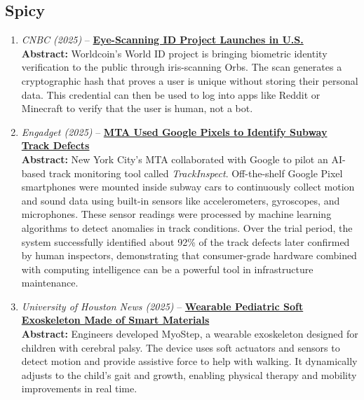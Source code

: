 \documentclass[12pt]{article}
\begin{document}
\begin{enumerate}[label=\arabic*.]
\end{enumerate}

\subsection*{Spicy}
\begin{enumerate}[label=\arabic*.]

 \item \textit{CNBC (2025)} -- \href{https://technews.acm.org/archives.cfm?fo=2025-04-apr#41}{\textbf{Eye-Scanning ID Project Launches in U.S.}}\\
\footnotesize\textbf{Abstract:} Worldcoin's World ID project is bringing biometric identity verification to the public through iris-scanning Orbs. The scan generates a cryptographic hash that proves a user is unique without storing their personal data. This credential can then be used to log into apps like Reddit or Minecraft to verify that the user is human, not a bot.\\

 \item \textit{Engadget (2025)} -- \href{https://technews.acm.org/archives.cfm?fo=2025-02-feb#35}{\textbf{MTA Used Google Pixels to Identify Subway Track Defects}}\\
\footnotesize\textbf{Abstract:} New York City’s MTA collaborated with Google to pilot an AI-based track monitoring tool called \textit{TrackInspect}. Off-the-shelf Google Pixel smartphones were mounted inside subway cars to continuously collect motion and sound data using built-in sensors like accelerometers, gyroscopes, and microphones. These sensor readings were processed by machine learning algorithms to detect anomalies in track conditions. Over the trial period, the system successfully identified about 92\% of the track defects later confirmed by human inspectors, demonstrating that consumer-grade hardware combined with computing intelligence can be a powerful tool in infrastructure maintenance.\\

 \item \textit{University of Houston News (2025)} -- \href{https://technews.acm.org/archives.cfm?fo=2025-04-apr#41}{\textbf{Wearable Pediatric Soft Exoskeleton Made of Smart Materials}}\\
\footnotesize\textbf{Abstract:} Engineers developed MyoStep, a wearable exoskeleton designed for children with cerebral palsy. The device uses soft actuators and sensors to detect motion and provide assistive force to help with walking. It dynamically adjusts to the child’s gait and growth, enabling physical therapy and mobility improvements in real time.\\


\end{enumerate}
\end{document}
